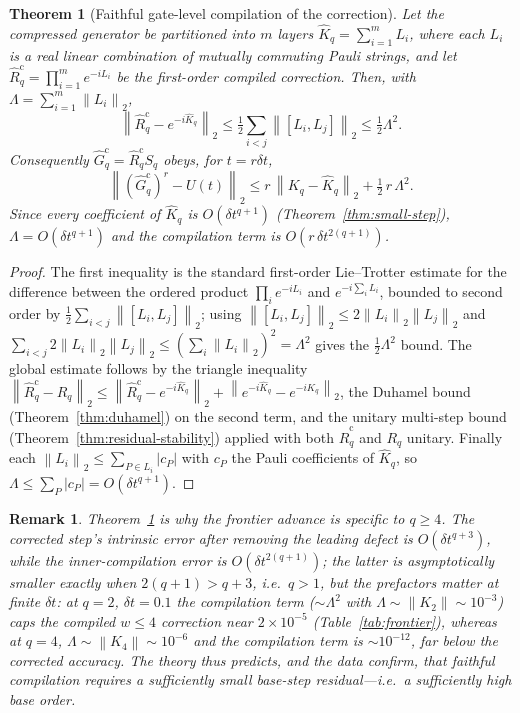 \documentclass[aps,prxquantum,reprint,superscriptaddress,nofootinbib,amsmath,amssymb]{revtex4-2}
\newcommand{\norm}[1]{\left\lVert #1 \right\rVert}
\newcommand{\abs}[1]{\left\lvert #1 \right\rvert}
\newcommand{\dt}{\delta t}
\newtheorem{theorem}{Theorem}
\newtheorem{remark}{Remark}
\begin{document}
\begin{theorem}[Faithful gate-level compilation of the correction]
\label{thm:faithful-compilation}
Let the compressed generator be partitioned into $m$ layers $\widehat K_q=\sum_{i=1}^{m}L_i$, where each $L_i$ is a real linear combination of \emph{mutually commuting} Pauli strings, and let $\widehat R_q^{\mathrm{c}}=\prod_{i=1}^{m}e^{-iL_i}$ be the first-order compiled correction. Then, with $\Lambda=\sum_{i=1}^{m}\norm{L_i}_2$,
\begin{equation}
    \norm{\widehat R_q^{\mathrm{c}}-e^{-i\widehat K_q}}_2\le\tfrac12\sum_{i<j}\norm{[L_i,L_j]}_2\le\tfrac12\Lambda^2 .
\end{equation}
Consequently $\widehat G_q^{\mathrm{c}}=\widehat R_q^{\mathrm{c}}S_q$ obeys, for $t=r\dt$,
\begin{equation}
    \norm{(\widehat G_q^{\mathrm{c}})^{r}-U(t)}_2\le r\,\norm{K_q-\widehat K_q}_2+\tfrac12\,r\,\Lambda^2 .
\end{equation}
Since every coefficient of $\widehat K_q$ is $O(\dt^{q+1})$ (Theorem~\ref{thm:small-step}), $\Lambda=O(\dt^{q+1})$ and the compilation term is $O(r\,\dt^{2(q+1)})$.
\end{theorem}

\begin{proof}
The first inequality is the standard first-order Lie--Trotter estimate for the difference between the ordered product $\prod_i e^{-iL_i}$ and $e^{-i\sum_i L_i}$, bounded to second order by $\tfrac12\sum_{i<j}\norm{[L_i,L_j]}_2$; using $\norm{[L_i,L_j]}_2\le2\norm{L_i}_2\norm{L_j}_2$ and $\sum_{i<j}2\norm{L_i}_2\norm{L_j}_2\le(\sum_i\norm{L_i}_2)^2=\Lambda^2$ gives the $\tfrac12\Lambda^2$ bound. The global estimate follows by the triangle inequality $\norm{\widehat R_q^{\mathrm{c}}-R_q}_2\le\norm{\widehat R_q^{\mathrm{c}}-e^{-i\widehat K_q}}_2+\norm{e^{-i\widehat K_q}-e^{-iK_q}}_2$, the Duhamel bound (Theorem~\ref{thm:duhamel}) on the second term, and the unitary multi-step bound (Theorem~\ref{thm:residual-stability}) applied with both $\widehat R_q^{\mathrm{c}}$ and $R_q$ unitary. Finally each $\norm{L_i}_2\le\sum_{P\in L_i}\abs{c_P}$ with $c_P$ the Pauli coefficients of $\widehat K_q$, so $\Lambda\le\sum_P\abs{c_P}=O(\dt^{q+1})$.
\end{proof}

\begin{remark}
Theorem~\ref{thm:faithful-compilation} is why the frontier advance is specific to $q\ge4$. The corrected step's intrinsic error after removing the leading defect is $O(\dt^{q+3})$, while the inner-compilation error is $O(\dt^{2(q+1)})$; the latter is asymptotically smaller exactly when $2(q+1)>q+3$, i.e.\ $q>1$, but the \emph{prefactors} matter at finite $\dt$: at $q=2$, $\dt=0.1$ the compilation term ($\sim\Lambda^2$ with $\Lambda\sim\norm{K_2}\sim10^{-3}$) caps the compiled $w\le4$ correction near $2\times10^{-5}$ (Table~\ref{tab:frontier}), whereas at $q=4$, $\Lambda\sim\norm{K_4}\sim10^{-6}$ and the compilation term is $\sim10^{-12}$, far below the corrected accuracy. The theory thus predicts, and the data confirm, that faithful compilation requires a sufficiently small base-step residual---i.e.\ a sufficiently high base order.
\end{remark}
\end{document}
